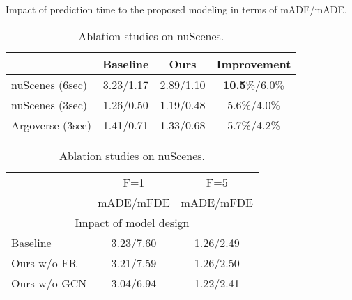 \documentclass{article} \usepackage{iclr2023_conference,times}
\begin{document}
\begin{table}[]
\begin{minipage}{.47\linewidth}
\caption{Impact of prediction time to the proposed modeling in terms of mADE/mADE.}
\label{tab:ablation_prediction_time}
      \centering
      {\scriptsize
         \begin{tabular}{l|cc|c} \hline
                         & Baseline  & Ours      & Improvement \\ \hline
        nuScenes (6sec)  & 3.23/1.17 & 2.89/1.10 & \textbf{10.5}\%/6.0\%  \\
        nuScenes (3sec)  & 1.26/0.50 & 1.19/0.48 & 5.6\%/4.0\%   \\
        Argoverse (3sec) & 1.41/0.71 & 1.33/0.68 & 5.7\%/4.2\% \\
        \hline
        \end{tabular}}
\end{minipage}
\hfill
\begin{minipage}{.45\linewidth}
    \renewcommand{\arraystretch}{1.3}
\caption{Ablation studies on nuScenes.}
\label{tab:ablation_main}
          \centering
          {\scriptsize
          \begin{tabular}{lcc}
                \hline
                \multirow{2}{*}{}                                                                                             & F=1                         & F=5                         \\
                                                                                                                              & mADE/mFDE                   & mADE/mFDE                   \\ \hline \hline
                \multicolumn{3}{c}{Impact of model design}                                                                            \\ \hline
                Baseline                                                                                                      & 3.23/7.60                   & 1.26/2.49                   \\
                Ours w/o FR                                                                                                   & 3.21/7.59                   & 1.26/2.50                   \\
                Ours w/o GCN                                                                                                  & 3.04/6.94                   & 1.22/2.41                   \\

\end{tabular}}
\end{minipage}
\end{table}
\end{document}
